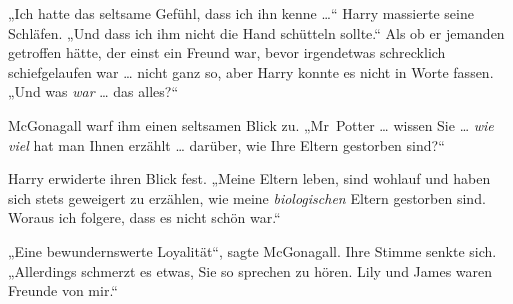 „Ich hatte das seltsame Gefühl, dass ich ihn kenne …“ Harry massierte seine Schläfen.
„Und dass ich ihm nicht die Hand schütteln sollte.“ Als ob er jemanden getroffen hätte, der einst ein Freund war, bevor irgendetwas schrecklich schiefgelaufen war … nicht ganz so, aber Harry konnte es nicht in Worte fassen.
„Und was \emph{war} … das alles?“

McGonagall warf ihm einen seltsamen Blick zu.
„Mr~Potter … wissen Sie … \emph{wie viel} hat man Ihnen erzählt … darüber, wie Ihre Eltern gestorben sind?“

Harry erwiderte ihren Blick fest.
„Meine Eltern leben, sind wohlauf und haben sich stets geweigert zu erzählen, wie meine \emph{biologischen} Eltern gestorben sind. Woraus ich folgere, dass es nicht schön war.“

„Eine bewundernswerte Loyalität“, sagte McGonagall. Ihre Stimme senkte sich.
„Allerdings schmerzt es etwas, Sie so sprechen zu hören. Lily und James waren Freunde von mir.“


